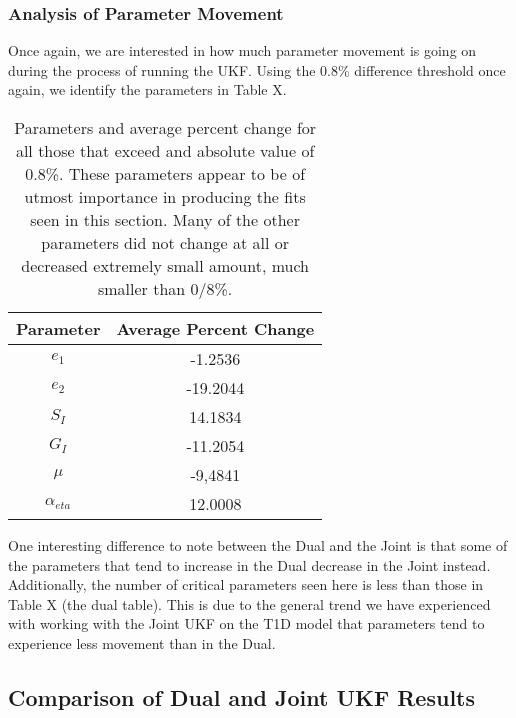 \subsubsection{Analysis of Parameter Movement}

Once again, we are interested in how much parameter movement is going on during the process of running the UKF.
Using the 0.8\% difference threshold once again, we identify the parameters in Table X.


\begin{table}[H]
  \begin{center}
    \label{tab:table1}
    \begin{tabular}{c|c} %
      \textbf{Parameter} & \textbf{Average Percent Change} \\
      \hline
      \textbf{$e_1$} & -1.2536\\
      \textbf{$e_2$} & -19.2044\\
      \textbf{$S_I$} & 14.1834\\
      \textbf{$G_I$} & -11.2054\\
      \textbf{$\mu$} & -9,4841\\
      \textbf{$\alpha_{eta}$} & 12.0008\\
    \end{tabular}
    \caption{Parameters and average percent change for all those that exceed and absolute value of 0.8\%. These parameters appear to be of utmost importance in producing the fits seen in this section. Many of the other parameters did not change at all or decreased extremely small amount, much smaller than 0/8\%.}
  \end{center}
\end{table}

One interesting difference to note between the Dual and the Joint is that some of the parameters that tend to increase in the Dual decrease in the Joint instead. Additionally, the number of critical parameters seen here is less than those in Table X (the dual table). This is due to the general trend we have experienced with working with the Joint UKF on the T1D model that parameters tend to experience less movement than in the Dual.


\subsection{Comparison of Dual and Joint UKF Results}

